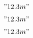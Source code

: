 \documentclass[12pt]{fksbase}
\begin{document}
 $"12.3 m"$

\makeatletter\fkssug@renglish\makeatother

 $"12.3 m"$

\makeatletter\fkssug@rczech\makeatother

 $"12.3 m"$
\end{document}
